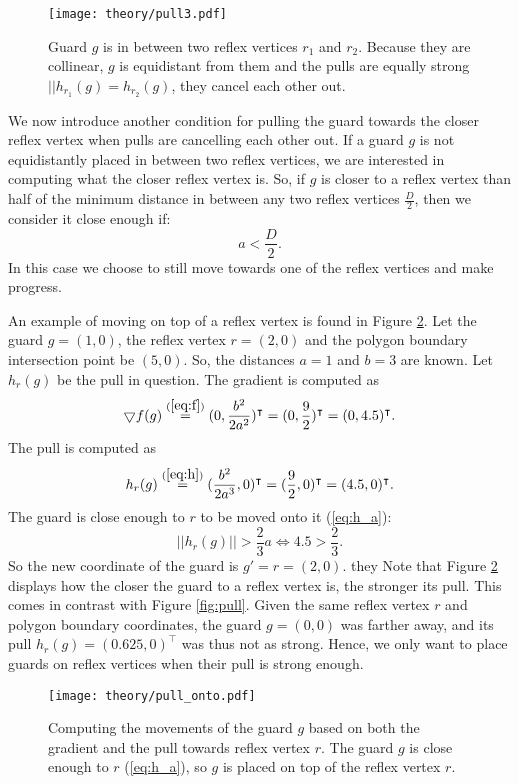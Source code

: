 \begin{figure}[h!]
    \centering
    \texttt{[image: theory/pull3.pdf]}
    \caption{Guard $g$ is in between two reflex vertices $r_1$ and $r_2$. Because they are collinear, $g$ is equidistant from them and the pulls are equally strong $||h_{r_1}(g) = h_{r_2}(g)$, they cancel each other out.}
    \label{fig:pull_cancel}
\end{figure}

We  now introduce another condition for pulling the guard towards the closer reflex vertex when pulls are cancelling each other out. If a guard $g$ is not equidistantly placed in between two reflex vertices, we are interested in computing what the closer reflex vertex is. So, if $g$ is closer to a reflex vertex than half of the minimum distance in between any two reflex vertices $\frac D 2$, then we consider it close enough if: $$a < \frac D 2.$$
In this case we  choose to still move towards one of the reflex vertices and make progress.

An example of moving on top of a reflex vertex is found in Figure \ref{fig:pull_onto}. Let the guard $g = (1, 0)$, the reflex vertex $r = (2, 0)$ and the polygon boundary intersection point be $(5, 0)$. So, the distances $a = 1$ and $b = 3$ are known. Let $h_r(g)$ be the pull in question. The gradient is computed as
$$\bigtriangledown f(g) \overset{(\ref{eq:f})}{=} (0, \frac{b^2}{2a^2})^\intercal = (0, \frac{9}{2})^\intercal = (0, 4.5)^\intercal.$$
The pull is computed as 
$$h_r(g) \overset{(\ref{eq:h})}{=} (\frac{b^2}{2a^3}, 0)^\intercal = (\frac{9}{2}, 0)^\intercal = (4.5, 0)^\intercal.$$
The guard is close enough to $r$ to be moved onto it (\ref{eq:h_a}):
$$||h_r(g)|| > \frac 2 3 a \iff 4.5 > \frac 2 3.$$
So the new coordinate of the guard is $g' = r = (2, 0)$.
they
Note that Figure \ref{fig:pull_onto} displays how the closer the guard to a reflex vertex is, the stronger its pull. This comes in contrast with Figure \ref{fig:pull}. Given the same reflex vertex $r$ and polygon boundary coordinates, the guard $g = (0, 0)$ was farther away, and its pull $h_r(g) = (0.625, 0)^\intercal$ was thus not as strong. Hence, we only want to place guards on reflex vertices when their pull is strong enough.

\begin{figure}
    \centering
    \texttt{[image: theory/pull\_onto.pdf]}
    \caption{Computing the movements of the guard $g$ based on both the gradient and the pull towards reflex vertex $r$. The guard $g$ is close enough to $r$ (\ref{eq:h_a}), so $g$ is placed on top of the reflex vertex $r$.}
    \label{fig:pull_onto}
\end{figure}

